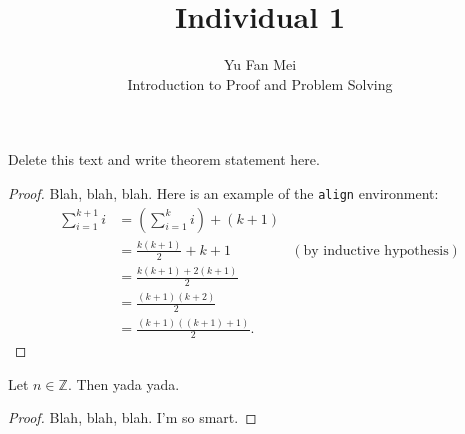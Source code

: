 \documentclass[12pt]{article}
\newenvironment{theorem}[2][Theorem]{\begin{trivlist}
\item[\hskip \labelsep {\bfseries #1}\hskip \labelsep {\bfseries #2.}]}{\end{trivlist}}
\begin{document}
 
 
\title{Individual 1}%
\author{Yu Fan Mei\\ %
Introduction to Proof and Problem Solving} %
 
\maketitle
 
\begin{theorem}{x.yz} %
Delete this text and write theorem statement here.
\end{theorem}
 
\begin{proof}
Blah, blah, blah.  Here is an example of the \texttt{align} environment:
\begin{align*}
\sum_{i=1}^{k+1}i & = \left(\sum_{i=1}^{k}i\right) +(k+1)\\ 
& = \frac{k(k+1)}{2}+k+1 & (\text{by inductive hypothesis})\\
& = \frac{k(k+1)+2(k+1)}{2}\\
& = \frac{(k+1)(k+2)}{2}\\
& = \frac{(k+1)((k+1)+1)}{2}.
\end{align*}
\end{proof}
 
\begin{theorem}{x.yz}
Let $n\in \mathbb{Z}$.  Then yada yada. 
\end{theorem}
 
\begin{proof}
Blah, blah, blah.  I'm so smart. 
\end{proof}
\end{document}
